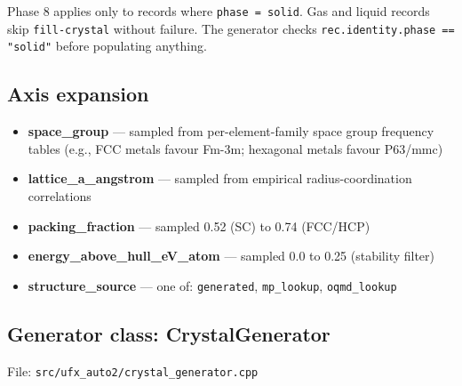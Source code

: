 \documentclass[11pt, a4paper]{article}
\begin{document}
Phase 8 applies only to records where \texttt{phase = solid}.  Gas and liquid
records skip \texttt{fill-crystal} without failure.  The generator checks
\texttt{rec.identity.phase == "solid"} before populating anything.

\subsection{Axis expansion}

\begin{itemize}[leftmargin=*, itemsep=2pt]
  \item \textbf{space\_group} --- sampled from per-element-family space group frequency tables
		(e.g., FCC metals favour Fm-3m; hexagonal metals favour P63/mmc)
  \item \textbf{lattice\_a\_angstrom} --- sampled from empirical radius-coordination correlations
  \item \textbf{packing\_fraction} --- sampled 0.52 (SC) to 0.74 (FCC/HCP)
  \item \textbf{energy\_above\_hull\_eV\_atom} --- sampled 0.0 to 0.25 (stability filter)
  \item \textbf{structure\_source} --- one of: \texttt{generated}, \texttt{mp\_lookup},
		\texttt{oqmd\_lookup}
\end{itemize}

\subsection{Generator class: CrystalGenerator}

File: \texttt{src/ufx\_auto2/crystal\_generator.cpp}
\end{document}
